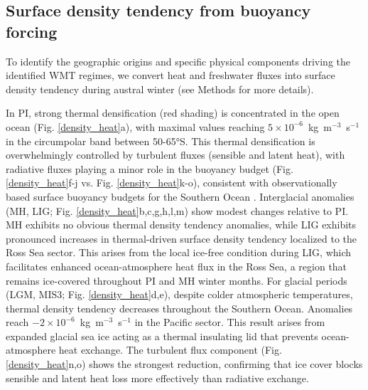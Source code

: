 \documentclass[pdflatex,sn-nature]{sn-jnl}
\begin{document}
\subsection{Surface density tendency from buoyancy forcing}

To identify the geographic origins and specific physical components driving the identified WMT regimes, we convert heat and freshwater fluxes into surface density tendency during austral winter (see Methods for more details).

In PI, strong thermal densification (red shading) is concentrated in the open ocean (Fig. \ref{density_heat}a), with maximal values reaching $5 \times 10^{-6}$~kg~m$^{-3}$~s$^{-1}$ in the circumpolar band between 50-65°S. This thermal densification is overwhelmingly controlled by turbulent fluxes (sensible and latent heat), with radiative fluxes playing a minor role in the buoyancy budget (Fig. \ref{density_heat}f-j vs. Fig. \ref{density_heat}k-o), consistent with observationally based surface buoyancy budgets for the Southern Ocean \cite{Cerovecki2013,Abernathey2016}.
Interglacial anomalies (MH, LIG; Fig. \ref{density_heat}b,c,g,h,l,m) show modest changes relative to PI. MH exhibits no obvious thermal density tendency anomalies, while
LIG exhibits pronounced increases in thermal-driven surface density tendency  localized to the Ross Sea sector. This arises from the local ice-free condition during LIG, which facilitates enhanced ocean-atmosphere heat flux in the Ross Sea, a region that remains ice-covered throughout PI and MH winter months.
For glacial periods (LGM, MIS3; Fig. \ref{density_heat}d,e), despite colder atmospheric temperatures, thermal density tendency decreases throughout the Southern Ocean. Anomalies reach $-2 \times 10^{-6}$~kg~m$^{-3}$~s$^{-1}$ in the Pacific sector. This result arises from expanded glacial sea ice acting as a thermal insulating lid that prevents ocean-atmosphere heat exchange. The turbulent flux component (Fig. \ref{density_heat}n,o) shows the strongest reduction, confirming that ice cover blocks sensible and latent heat loss more effectively than radiative exchange.
\end{document}
